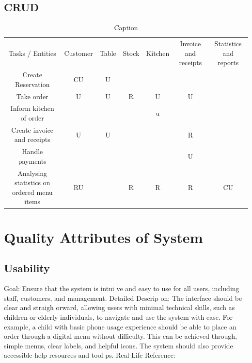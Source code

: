 \documentclass{article}
\begin{document}
\subsection{CRUD}

\begin{table}
    \centering
    \begin{tabular}{ccccccc}
        Tasks / Entities & Customer & Table & Stock & Kitchen & Invoice and receipts &  Statistics and reports \\
        Create Reservation & CU & U &  &  &  & \\
        Take order & U & U & R & U & U & \\
        Inform kitchen of order &  &  &  & u &  & \\
        Create invoice and receipts & U & U &  &  & R & \\
        Handle payments &  &  &  &  & U & \\
        Analysing statistics on ordered menu items & RU &  & R & R & R & CU \\
    \end{tabular}
    \caption{Caption}
    \label{tab:my_label}
\end{table}


\section{Quality Attributes of System}

\subsection{Usability} 
Goal: Ensure that the system is intui ve and easy to use for all users, including staff, 
customers, and management. 
Detailed Descrip on: The interface should be clear and straigh orward, allowing users with 
minimal technical skills, such as children or elderly individuals, to navigate and use the 
system with ease. For example, a child with basic phone usage experience should be able to 
place an order through a digital menu without difficulty. This can be achieved through, 
simple menus, clear labels, and helpful icons. The system should also provide accessible help 
resources and tool ps. 
Real-Life Reference:  
\end{document}
